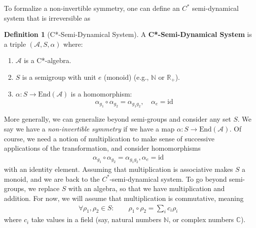 \documentclass{article}
\theoremstyle{definition}
\newtheorem{definition}{Definition}[section]
\begin{document}
  To formalize a non-invertible symmetry, one can define an $C^{*}$ semi-dynamical
  system that is irreversible as
  \begin{definition}[C*-Semi-Dynamical System]
    A \textbf{C*-Semi-Dynamical System} is a triple $(\mathcal{A}, S, \alpha)$
    where:
    \begin{enumerate}
      \item $\mathcal{A}$ is a C*-algebra.

      \item $S$ is a semigroup with unit $e$ (monoid) (e.g., $\mathbb{N}$ or
        $\mathbb{R}_{+}$).

      \item $\alpha: S \to \mathrm{End}(\mathcal{A})$ is a homomorphism:
        \begin{equation}
          \alpha_{g_1}\circ \alpha_{g_2}= \alpha_{g_1g_2}, \quad \alpha_{e}= \mathrm{id}
        \end{equation}
    \end{enumerate}
  \end{definition}
  More generally, we can generalize beyond semi-groups and consider any set $S$.
  We say we have a {\it non-invertible symmetry} if we have a map $\alpha: S\to \mathrm{End}
  (\mathcal{A})$. Of course, we need a notion of multiplication to make sense of
  successive applications of the transformation, and consider homomorphisms
  \begin{eqnarray}
    \alpha_{g_1}\circ \alpha_{g_2}=\alpha_{g_1 g_2}, \alpha_e=\text{id}
  \end{eqnarray}
  with an identity element. Assuming that multiplication is associative makes $S$
  a monoid, and we are back to the $C^{*}$-semi-dynamical system. To go beyond semi-groups,
  we replace $S$ with an algebra, so that we have multiplication and addition.
  For now, we will assume that multiplication is commutative, meaning
  \begin{eqnarray}
    \label{muliplication} \forall \rho_1,\rho_2\in S:\qquad \rho_1\circ \rho_2=\sum_i
    c_i \rho_i
  \end{eqnarray}
  where $c_{i}$ take values in a field (say, natural numbers $\mathbb{N}$, or complex
  numbers $\mathbb{C}$).
\end{document}
